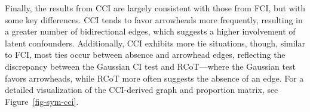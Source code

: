 \documentclass[
]{article}
\begin{document}
Finally, the results from CCI are largely consistent with those from
FCI, but with some key differences. CCI tends to favor arrowheads more
frequently, resulting in a greater number of bidirectional edges, which
suggests a higher involvement of latent confounders. Additionally, CCI
exhibits more tie situations, though, similar to FCI, most ties occur
between absence and arrowhead edges, reflecting the discrepancy between
the Gaussian CI test and RCoT---where the Gaussian test favors
arrowheads, while RCoT more often suggests the absence of an edge. For a
detailed visualization of the CCI-derived graph and proportion matrix,
see Figure~\ref{fig-sym-cci}.

\begin{figure}

\begin{minipage}{\linewidth}



\end{minipage}%
\newline
\begin{minipage}{\linewidth}

\centering{

}
\end{minipage}
\end{figure}
\end{document}
